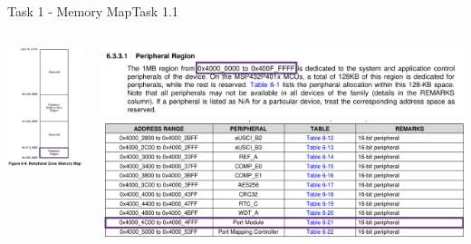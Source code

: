 \begin{frame}{Task 1 - Memory Map}{Task 1.1}
\begin{solution}
\begin{columns}
\begin{column}{0.4\textwidth}
        \includegraphics[height=0.5\paperheight]{./figures/peripherals_region.png}
      \end{column}
      \begin{column}{0.6\textwidth}
        \includegraphics[width=0.5\paperwidth]{./figures/system_and_application_control_peripherals.png}
        \includegraphics[width=0.5\paperwidth]{./figures/port_module.png}

\end{column}
\end{columns}
\end{solution}
\end{frame}
